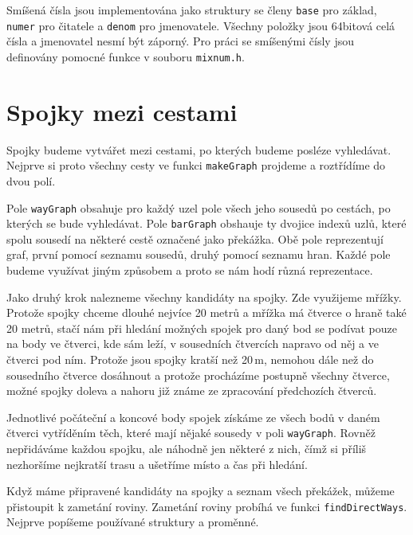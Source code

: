 Smíšená čísla jsou implementována jako struktury se členy \verb|base| pro
základ, \verb|numer| pro čitatele a \verb|denom| pro jmenovatele. Všechny
položky jsou 64bitová celá čísla a jmenovatel nesmí být záporný. Pro práci se
smíšenými čísly jsou definovány pomocné funkce v souboru \verb|mixnum.h|.

\section{Spojky mezi cestami}
Spojky budeme vytvářet mezi cestami, po kterých budeme posléze vyhledávat.
Nejprve si proto všechny cesty ve funkci \verb|makeGraph| projdeme a roztřídíme
do dvou polí. 

Pole \verb|wayGraph| obsahuje pro každý uzel pole všech jeho sousedů po cestách,
po kterých se bude vyhledávat. Pole \verb|barGraph| obshauje ty dvojice indexů
uzlů, které spolu sousedí na některé cestě označené jako překážka. Obě pole
reprezentují graf, první pomocí seznamu sousedů, druhý pomocí seznamu hran.
Každé pole budeme využívat jiným způsobem a proto se nám hodí různá
reprezentace.

Jako druhý krok nalezneme všechny kandidáty na spojky. Zde využijeme mřížky.
Protože spojky chceme dlouhé nejvíce 20 metrů a mřížka má čtverce o hraně také
20 metrů, stačí nám při hledání možných spojek pro daný bod se podívat pouze na
body ve čtverci, kde sám leží, v sousedních čtvercích napravo od něj a ve
čtverci pod ním. Protože jsou spojky kratší než 20\,m, nemohou dále než do sousedního
čtverce dosáhnout a protože procházíme postupně všechny čtverce, možné spojky
doleva a nahoru již známe ze zpracování předchozích čtverců. 

Jednotlivé počáteční a koncové body spojek získáme ze všech bodů v daném čtverci
vytříděním těch, které mají nějaké sousedy v poli \verb|wayGraph|. Rovněž
nepřidáváme každou spojku, ale náhodně jen některé z nich, čímž si příliš
nezhoršíme nejkratší trasu a ušetříme místo a čas při hledání.

Když máme připravené kandidáty na spojky a seznam všech překážek, můžeme
přistoupit k zametání roviny. Zametání roviny probíhá ve funkci
\verb|findDirectWays|. Nejprve popíšeme používané struktury a proměnné.

